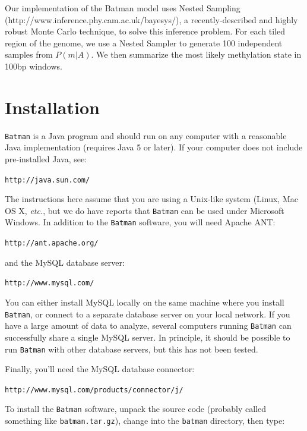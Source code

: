 \documentclass[a4paper, 11pt]{article}
\begin{document}
Our implementation of the Batman model uses Nested Sampling (http://www.inference.phy.cam.ac.uk/bayesys/), a recently-described
and highly robust Monte Carlo technique, to solve this inference problem.  For each
tiled region of the genome, we use a Nested Sampler to generate 100 independent
samples from $P(m | A)$.  We then summarize the most likely methylation state in 100bp
windows.

\section{Installation}

{\tt Batman} is a Java program and should run on any computer with a reasonable
Java implementation (requires Java 5 or later).  If your computer does not include
pre-installed Java, see:

\begin{alltt}    http://java.sun.com/\end{alltt}

The instructions here assume that you are using a Unix-like system (Linux, Mac OS X,
{\it etc.}, but we do have reports that {\tt Batman} can be used under Microsoft
Windows.  In addition to the {\tt Batman} software, you will need Apache ANT:

\begin{alltt}    http://ant.apache.org/\end{alltt}

and the MySQL database server:

\begin{alltt}    http://www.mysql.com/\end{alltt}

You can either install MySQL locally on the same machine where you install {\tt Batman},
or connect to a separate database server on your local network.  If you have a large
amount of data to analyze, several computers running {\tt Batman} can successfully
share a single MySQL server.  In principle, it should be possible to run {\tt Batman}
with other database servers, but this has not been tested.

Finally, you'll need the MySQL database connector:

\begin{alltt}    http://www.mysql.com/products/connector/j/\end{alltt}

To install the {\tt Batman} software, unpack the source code (probably called something
like {\tt batman.tar.gz}), change into the {\tt batman} directory, then type:
\end{document}
